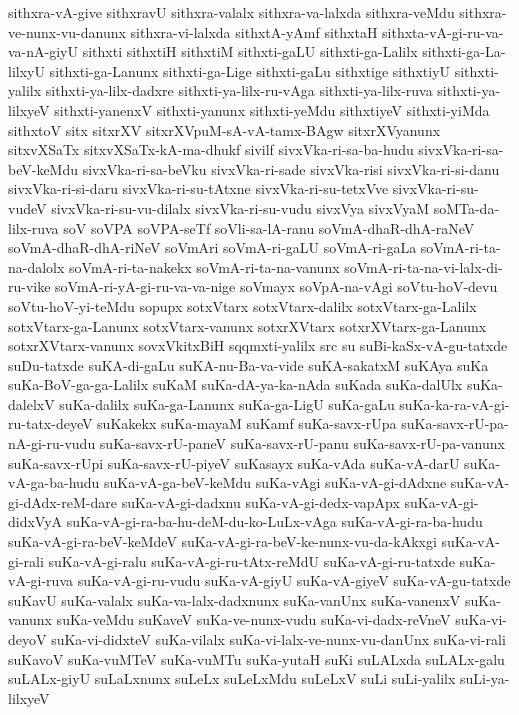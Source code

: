 {sithxra-vA-give
sithxravU
sithxra-valalx
sithxra-va-lalxda
sithxra-veMdu
sithxra-ve-nunx-vu-danunx
sithxra-vi-lalxda
sithxtA-yAmf
sithxtaH
sithxta-vA-gi-ru-va-va-nA-giyU
sithxti
sithxtiH
sithxtiM
sithxti-gaLU
sithxti-ga-Lalilx
sithxti-ga-La-lilxyU
sithxti-ga-Lanunx
sithxti-ga-Lige
sithxti-gaLu
sithxtige
sithxtiyU
sithxti-yalilx
sithxti-ya-lilx-dadxre
sithxti-ya-lilx-ru-vAga
sithxti-ya-lilx-ruva
sithxti-ya-lilxyeV
sithxti-yanenxV
sithxti-yanunx
sithxti-yeMdu
sithxtiyeV
sithxti-yiMda
sithxtoV
sitx
sitxrXV
sitxrXVpuM-sA-vA-tamx-BAgw
sitxrXVyanunx
sitxvXSaTx
sitxvXSaTx-kA-ma-dhukf
sivilf
sivxVka-ri-sa-ba-hudu
sivxVka-ri-sa-beV-keMdu
sivxVka-ri-sa-beVku
sivxVka-ri-sade
sivxVka-risi
sivxVka-ri-si-danu
sivxVka-ri-si-daru
sivxVka-ri-su-tAtxne
sivxVka-ri-su-tetxVve
sivxVka-ri-su-vudeV
sivxVka-ri-su-vu-dilalx
sivxVka-ri-su-vudu
sivxVya
sivxVyaM
soMTa-da-lilx-ruva
soV
soVPA
soVPA-seTf
soVli-sa-lA-ranu
soVmA-dhaR-dhA-raNeV
soVmA-dhaR-dhA-riNeV
soVmAri
soVmA-ri-gaLU
soVmA-ri-gaLa
soVmA-ri-ta-na-dalolx
soVmA-ri-ta-nakekx
soVmA-ri-ta-na-vanunx
soVmA-ri-ta-na-vi-lalx-di-ru-vike
soVmA-ri-yA-gi-ru-va-va-nige
soVmayx
soVpA-na-vAgi
soVtu-hoV-devu
soVtu-hoV-yi-teMdu
sopupx
sotxVtarx
sotxVtarx-dalilx
sotxVtarx-ga-Lalilx
sotxVtarx-ga-Lanunx
sotxVtarx-vanunx
sotxrXVtarx
sotxrXVtarx-ga-Lanunx
sotxrXVtarx-vanunx
sovxVkitxBiH
sqqmxti-yalilx
src
su
suBi-kaSx-vA-gu-tatxde
suDu-tatxde
suKA-di-gaLu
suKA-nu-Ba-va-vide
suKA-sakatxM
suKAya
suKa
suKa-BoV-ga-ga-Lalilx
suKaM
suKa-dA-ya-ka-nAda
suKada
suKa-dalUlx
suKa-dalelxV
suKa-dalilx
suKa-ga-Lanunx
suKa-ga-LigU
suKa-gaLu
suKa-ka-ra-vA-gi-ru-tatx-deyeV
suKakekx
suKa-mayaM
suKamf
suKa-savx-rUpa
suKa-savx-rU-pa-nA-gi-ru-vudu
suKa-savx-rU-paneV
suKa-savx-rU-panu
suKa-savx-rU-pa-vanunx
suKa-savx-rUpi
suKa-savx-rU-piyeV
suKasayx
suKa-vAda
suKa-vA-darU
suKa-vA-ga-ba-hudu
suKa-vA-ga-beV-keMdu
suKa-vAgi
suKa-vA-gi-dAdxne
suKa-vA-gi-dAdx-reM-dare
suKa-vA-gi-dadxnu
suKa-vA-gi-dedx-vapApx
suKa-vA-gi-didxVyA
suKa-vA-gi-ra-ba-hu-deM-du-ko-LuLx-vAga
suKa-vA-gi-ra-ba-hudu
suKa-vA-gi-ra-beV-keMdeV
suKa-vA-gi-ra-beV-ke-nunx-vu-da-kAkxgi
suKa-vA-gi-rali
suKa-vA-gi-ralu
suKa-vA-gi-ru-tAtx-reMdU
suKa-vA-gi-ru-tatxde
suKa-vA-gi-ruva
suKa-vA-gi-ru-vudu
suKa-vA-giyU
suKa-vA-giyeV
suKa-vA-gu-tatxde
suKavU
suKa-valalx
suKa-va-lalx-dadxnunx
suKa-vanUnx
suKa-vanenxV
suKa-vanunx
suKa-veMdu
suKaveV
suKa-ve-nunx-vudu
suKa-vi-dadx-reVneV
suKa-vi-deyoV
suKa-vi-didxteV
suKa-vilalx
suKa-vi-lalx-ve-nunx-vu-danUnx
suKa-vi-rali
suKavoV
suKa-vuMTeV
suKa-vuMTu
suKa-yutaH
suKi
suLALxda
suLALx-galu
suLALx-giyU
suLaLxnunx
suLeLx
suLeLxMdu
suLeLxV
suLi
suLi-yalilx
suLi-ya-lilxyeV
}

